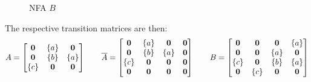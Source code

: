 \begin{example}
\begin{figure}[h!]
\begin{minipage}{0.45\textwidth}
\begin{tikzpicture}
  \end{tikzpicture}
  \caption{NFA \(B\)}
  \end{minipage}
  \end{figure}
  The respective transition matrices are then:
  \begin{align*}
    A =
      \begin{bmatrix}
        \zero & \braces{a} & \zero \\
        \zero & \braces{b} & \braces{a} \\
        \braces{c} & \zero & \zero
      \end{bmatrix}
    \qquad
    \overline{A} =
      \begin{bmatrix}
        \zero & \braces{a} & \zero & \zero \\
        \zero & \braces{b} & \braces{a} & \zero \\
        \braces{c} & \zero & \zero & \zero \\
        \zero & \zero & \zero & \zero
      \end{bmatrix}
    \qquad
    B =
      \begin{bmatrix}
        \zero & \zero & \zero & \braces{a} \\
        \zero & \zero & \braces{a} & \zero \\
        \braces{c} & \zero & \braces{b} & \braces{a} \\
        \zero & \braces{c} & \zero & \zero
      \end{bmatrix}
  \end{align*}


\end{example}
